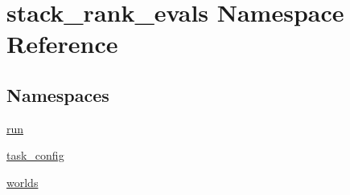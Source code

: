 \hypertarget{namespacestack__rank__evals}{}\section{stack\+\_\+rank\+\_\+evals Namespace Reference}
\label{namespacestack__rank__evals}
\subsection*{Namespaces}
\begin{DoxyCompactItemize}
\item 
 \hyperlink{namespacestack__rank__evals_1_1run}{run}
\item 
 \hyperlink{namespacestack__rank__evals_1_1task__config}{task\+\_\+config}
\item 
 \hyperlink{namespacestack__rank__evals_1_1worlds}{worlds}
\end{DoxyCompactItemize}
